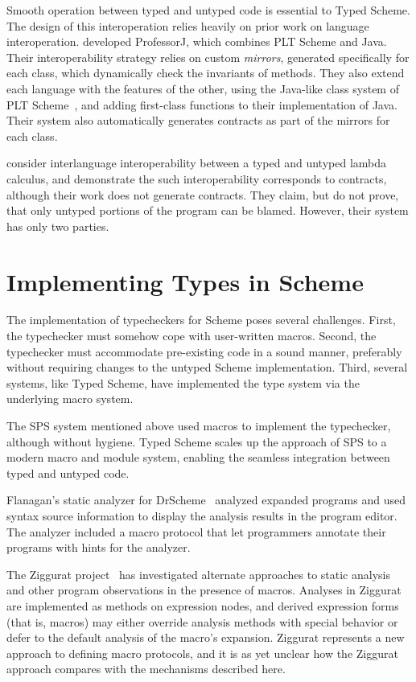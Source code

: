 \begin{schemeregion}
Smooth operation between typed and untyped code is essential to Typed
Scheme.  The design of this interoperation relies heavily on prior
work on language interoperation. \citet{gff:oopsla05} developed
ProfessorJ, which combines PLT Scheme and Java.  Their
interoperability strategy relies on custom \emph{mirrors}, generated
specifically for each class, which dynamically check the invariants of
methods.  They also extend each language with the features of the
other, using the Java-like class system of PLT
Scheme~\cite{fff:classes}, and adding first-class functions to their
implementation of Java.  Their system also automatically generates
contracts as part of the mirrors for each class. 

\citet{mf:multilang-toplas} consider
interlanguage interoperability between a typed and untyped lambda
calculus, and demonstrate the such interoperability corresponds to
contracts, although their work does not generate contracts.  They
claim, but do not prove, that only untyped portions of the program can
be blamed.  However, their system  has only two parties.  

\section{Implementing Types in Scheme}

The implementation of typecheckers for Scheme poses several
challenges.  First, the typechecker must somehow cope with 
user-written macros.  Second, the typechecker must accommodate
pre-existing code in a sound manner, preferably without requiring
changes to the untyped Scheme implementation.  Third, several systems,
like Typed Scheme, have implemented the type system via the underlying
macro system.

The SPS system mentioned above used macros to implement the
typechecker, although without hygiene.  Typed Scheme scales up the
approach of SPS to a modern macro and module system, enabling the
seamless integration between typed and untyped code.

Flanagan's static analyzer for DrScheme~\cite{ffkwf:mrspidey} analyzed
expanded programs and used syntax source information to display the
analysis results in the program editor. The analyzer included a macro
protocol that let programmers annotate their programs with hints for
the analyzer.

The Ziggurat project~\cite{fs:ziggurat-jfp} has investigated
alternate approaches to static analysis and other program observations
in the presence of macros. Analyses in Ziggurat are implemented as
methods on expression nodes, and derived expression forms (that is,
macros) may either override analysis methods with special behavior or
defer to the default analysis of the macro's expansion. Ziggurat
represents a new approach to defining macro protocols, and it is as
yet unclear how the Ziggurat approach compares with the mechanisms
described here.



\end{schemeregion}
